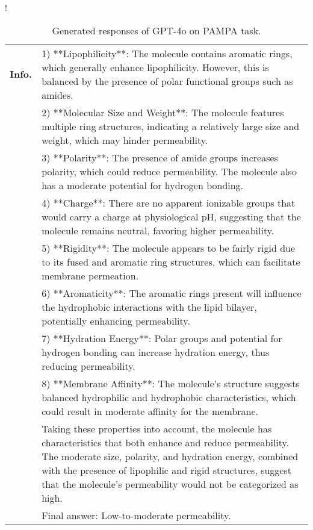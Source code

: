 \begin{table}[ht!]
\begin{resizebox}{\linewidth}{!}
{\begin{tabular}{p{1.2cm} p{18cm}}
\textbf{Info.} & 1) **Lipophilicity**: The molecule contains aromatic rings, which generally enhance lipophilicity. However, this is balanced by the presence of polar functional groups such as amides. \\

& 2) **Molecular Size and Weight**: The molecule features multiple ring structures, indicating a relatively large size and weight, which may hinder permeability. \\

& 3) **Polarity**: The presence of amide groups increases polarity, which could reduce permeability. The molecule also has a moderate potential for hydrogen bonding. \\

& 4) **Charge**: There are no apparent ionizable groups that would carry a charge at physiological pH, suggesting that the molecule remains neutral, favoring higher permeability. \\

& 5) **Rigidity**: The molecule appears to be fairly rigid due to its fused and aromatic ring structures, which can facilitate membrane permeation.\\

& 6) **Aromaticity**: The aromatic rings present will influence the hydrophobic interactions with the lipid bilayer, potentially enhancing permeability. \\

& 7) **Hydration Energy**: Polar groups and potential for hydrogen bonding can increase hydration energy, thus reducing permeability. \\

& 8) **Membrane Affinity**: The molecule's structure suggests balanced hydrophilic and hydrophobic characteristics, which could result in moderate affinity for the membrane. \\

& Taking these properties into account, the molecule has characteristics that both enhance and reduce permeability. The moderate size, polarity, and hydration energy, combined with the presence of lipophilic and rigid structures, suggest that the molecule's permeability would not be categorized as high.\\

& Final answer: Low-to-moderate permeability. \\
\bottomrule
\end{tabular}}
\end{resizebox}
\vspace{-0.1in}
\caption{Generated responses of GPT-4o on PAMPA task.}
\label{app:tab:pampa_GPT4o}
\end{table}
